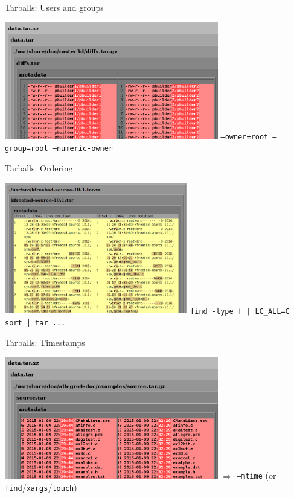 \documentclass[14pt]{beamer}
\begin{document}
\begin{frame}{Tarballs: Users and groups}
 \begin{center}
  \includegraphics[width=0.7\textwidth]{images/examples/user_and_group_in_tarball.png}
  \vfill
  \texttt{--owner=root --group=root --numeric-owner}
 \end{center}
\end{frame}

\begin{frame}{Tarballs: Ordering}
 \begin{center}
  \includegraphics[width=0.6\textwidth]{images/examples/random_order_in_tarball.png}
  \vfill
  \texttt{find -type f | LC\_ALL=C sort | tar ...}
 \end{center}
\end{frame}

\begin{frame}{Tarballs: Timestamps}
 \begin{center}
  \includegraphics[width=0.7\textwidth]{images/examples/timestamps_in_tarball.png}
  \vfill
  $\Longrightarrow$ \texttt{--mtime} (or \texttt{find}/\texttt{xargs}/\texttt{touch})
 \end{center}
\end{frame}
\end{document}
